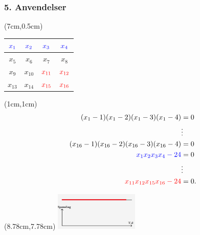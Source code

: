 \documentclass[10pt,notheorems,xcolor=pdftex,dvipsnames,table]{beamer}
\renewcommand{\{}{\left\lbrace}
\renewcommand{\}}{\right\rbrace}
\begin{document}
\begin{frame}[t]
\frametitle{
		\LARGE{5. Anvendelser}}
\begin{textblock*}{5cm}(7cm,0.5cm)
\begin{table} 
\begin{tabular}{|c|c||c|c|} 
\hline
${\color{blue}x_1}$ & ${\color{blue}x_2}$ & ${\color{blue}x_3}$ & ${\color{blue}x_4}$\\
\hline
$x_5$ & $x_6$ & $x_7$ & $x_8$ \\
\hline\hline
$x_9$ & $x_{10}$ & ${\color{red}x_{11}}$ & ${\color{red}x_{12}}$\\
\hline
$x_{13}$ & $x_{14}$ & ${\color{red}x_{15}}$ & ${\color{red}x_{16}}$\\
\hline
\end{tabular} 
\end{table}
\end{textblock*}
\begin{textblock*}{0.1cm}(1cm,1cm)
\begin{align*}
(x_1-1)(x_1-2)(x_1-3)(x_1-4) &= 0  \\
  &\vdots \\
(x_{16}-1)(x_{16}-2)(x_{16}-3)(x_{16}-4) &= 0\\
{\color{blue}x_1x_2x_3x_4 - 24} &= 0  \\
   &\vdots  \\
{\color{red}x_{11}x_{12}x_{15}x_{16} - 24} &= 0. 
\end{align*}
\end{textblock*}
				\begin{textblock*}{0.1cm}(8.78cm,7.78cm)  
					\includegraphics[width=4cm]{disposition/d19.jpg}
				\end{textblock*}	
\end{frame}
\end{document}
